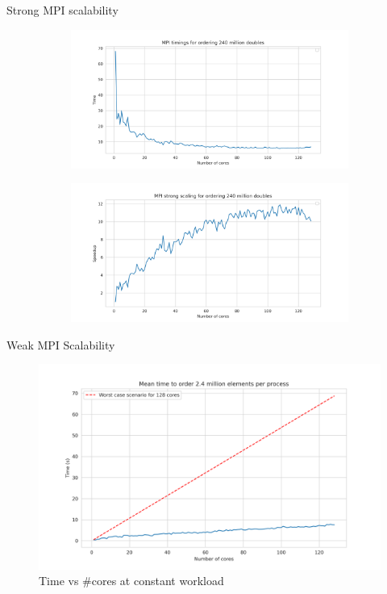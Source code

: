 \documentclass[11pt]{beamer}
\begin{document}
\begin{frame}{Strong MPI scalability}
	\begin{figure}
		\begin{subfigure}{0.75\textwidth}
			\centering
			\includegraphics[width=0.7\linewidth]{../exercise2/plots/smpi_timings}
			\label{fig:smpitimings}
		\end{subfigure}
		\begin{subfigure}{0.75\textwidth}
			\centering
			\includegraphics[width=0.7\linewidth]{../exercise2/plots/mpi_scaling}
			\label{fig:mpiscaling}
		\end{subfigure}
	\end{figure}
\end{frame}

\begin{frame}{Weak MPI Scalability}
	\begin{figure}[h]
		\centering
		\includegraphics[width=0.7\linewidth]{../exercise2/plots/wmpi_timings}
		\caption[wMPI Timings]{Time vs \#cores at constant workload}
		\label{fig:wmpitimings}
	\end{figure}
\end{frame}
\end{document}
